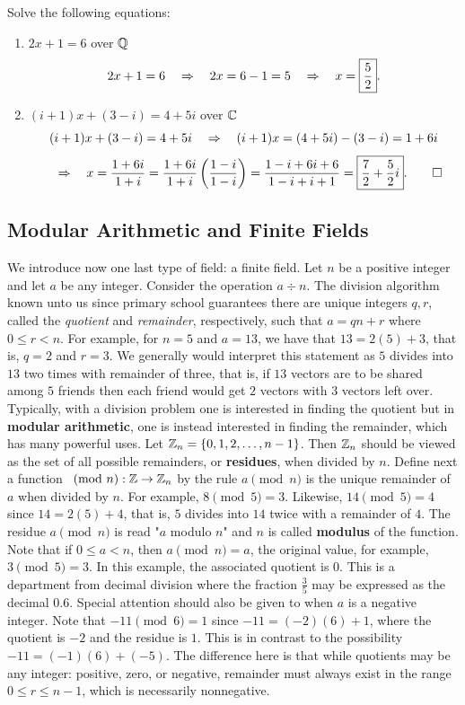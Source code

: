 \begin{Exam} Solve the following equations:
\begin{enumerate}
\item $2x+1=6$ over $\mathbb{Q}$\\
\[2x+1=6 \quad\Rightarrow\quad 2x = 6-1=5 \quad\Rightarrow\quad x = \fbox{$\dfrac{5}{2}$}.\]

\item $(i+1)x + (3-i) = 4+5i$ over $\mathbb{C}$\\
\[ (i+1)x + (3-i) = 4+5i \quad\Rightarrow\quad (i+1)x = (4+5i) - (3-i) = 1+6i\]\[ \quad\Rightarrow\quad x = \dfrac{1+6i}{1+i} = \dfrac{1+6i}{1+i}\left(\dfrac{1-i}{1-i}\right) = \dfrac{1-i+6i+6}{1-i+i+1} = \fbox{$\dfrac{7}{2} + \dfrac{5}{2}i$}.\qedhere\]
\end{enumerate}
\end{Exam}\vs


\subsection{Modular Arithmetic and Finite Fields}
We introduce now one last type of field: a finite field. Let $n$ be a positive integer and let $a$ be any integer. Consider the operation $a\div n$. The division algorithm known unto us since primary school guarantees there are unique integers $q, r$, called the \emph{quotient} and \emph{remainder}, respectively, such that $a=qn+r$ where $0\le r< n$. For example, for $n=5$ and $a=13$, we have that $13=2(5) + 3$, that is, $q=2$ and $r=3$. We generally would interpret this statement as $5$ divides into $13$ two times with remainder of three, that is, if $13$ vectors are to be shared among $5$ friends then each friend would get $2$ vectors with $3$ vectors left over. Typically, with a division problem one is interested in finding the quotient but in \textbf{modular arithmetic}, one is instead interested in finding the remainder, which has many powerful uses. Let $\mathbb{Z}_n = \{0, 1, 2, \ldots, n-1\}$. Then $\mathbb{Z}_n$ should be viewed as the set of all possible remainders, or \textbf{residues}, when divided by $n$. Define next a function $\pmod n : \mathbb{Z} \to \mathbb{Z}_n$ by the rule $a \pmod n$ is the unique remainder of $a$ when divided by $n$. For example, $8 \pmod 5 = 3$. Likewise, $14\pmod 5 = 4$ since $14=2(5)+4$, that is, $5$ divides into $14$ twice with a remainder of $4$. The residue $a\pmod n$ is read "$a$ modulo $n$" and $n$ is called \textbf{modulus} of the function.\\

Note that if $0\le a < n$, then $a\pmod n = a$, the original value, for example, $3\pmod 5 = 3$. In this example, the associated quotient is $0$. This is a department from decimal division where the fraction $\frac{3}{5}$ may be expressed as the decimal $0.6$. Special attention should also be given to when $a$ is a negative integer. Note that $-11 \pmod 6 = 1$ since $-11 = (-2)(6) + 1$, where the quotient is $-2$ and the residue is $1$. This is in contrast to the possibility $-11 = (-1)(6) + (-5)$. The difference here is that while quotients may be any integer: positive, zero, or negative, remainder must always exist in the range $0\le r \le n-1$, which is necessarily nonnegative. \\

